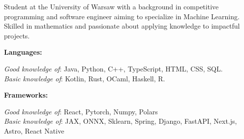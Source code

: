 \documentclass[9pt]{developercv} %
\begin{document}
\begin{minipage}[t]{0.40\textwidth}
	\vspace{-6pt}
 
	Student at the University of Warsaw with a background in competitive programming and software engineer aiming to specialize in Machine Learning. Skilled in mathematics and passionate about applying knowledge to impactful projects. \\
\end{minipage}
\hfill %
\begin{minipage}[t]{0.55\textwidth}
    \vspace{-6pt}
    
    \begin{minipage}[t]{0.15\textwidth}
        \textbf{Languages:}
    \end{minipage}
    \hfill
    \begin{minipage}[t]{0.75\textwidth}
      \textsl{Good knowledge of}: Java, Python, C++, TypeScript, HTML, CSS, SQL.\\
      \textsl{Basic knowledge of}: Kotlin, Rust, OCaml, Haskell, R.
    \end{minipage}
    \vspace{4mm}
    
    \begin{minipage}[t]{0.15\textwidth}
        \textbf{Frameworks:}
    \end{minipage}
    \hfill
    \begin{minipage}[t]{0.75\textwidth}
      \textsl{Good knowledge of}: React, Pytorch, Numpy, Polars \\
      \textsl{Basic knowledge of}: JAX, ONNX, Sklearn, Spring, Django, FastAPI, Next.js, Astro, React Native
    \end{minipage}
\end{minipage}
\end{document}

